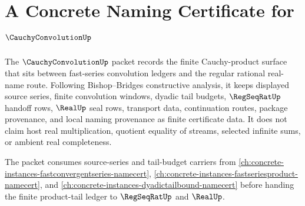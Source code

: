 \chapter{A Concrete Naming Certificate for $\CauchyConvolutionUp$}
\label{ch:concrete-instances-cauchyconvolution-namecert}

The $\CauchyConvolutionUp$ packet records the finite Cauchy-product surface that sits between fast-series convolution ledgers and the regular rational real-name route. Following Bishop--Bridges constructive analysis, it keeps displayed source series, finite convolution windows, dyadic tail budgets, $\RegSeqRatUp$ handoff rows, $\RealUp$ seal rows, transport data, continuation routes, package provenance, and local naming provenance as finite certificate data. It does not claim host real multiplication, quotient equality of streams, selected infinite sums, or ambient real completeness.

The packet consumes source-series and tail-budget carriers from \autoref{ch:concrete-instances-fastconvergentseries-namecert}, \autoref{ch:concrete-instances-fastseriesproduct-namecert}, and \autoref{ch:concrete-instances-dyadictailbound-namecert} before handing the finite product-tail ledger to $\RegSeqRatUp$ and $\RealUp$.

